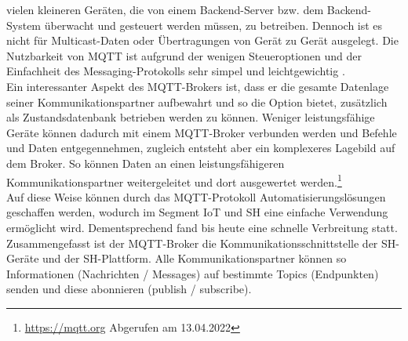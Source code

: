         vielen kleineren Geräten, die von einem Backend-Server bzw. dem Backend-System überwacht und gesteuert werden müssen, zu 
        betreiben. Dennoch ist es nicht für Multicast-Daten oder Übertragungen von Gerät zu Gerät ausgelegt. Die Nutzbarkeit 
        von \acs{MQTT} ist aufgrund der wenigen Steueroptionen und der Einfachheit des Messaging-Protokolls sehr simpel und 
        leichtgewichtig \cite{Naik2017}. 
        \\
        \linebreak
        Ein interessanter Aspekt des \acs{MQTT}-Brokers ist, dass er die gesamte Datenlage seiner Kommunikationspartner aufbewahrt und 
        so die Option bietet, zusätzlich als Zustandsdatenbank betrieben werden zu können. Weniger leistungsfähige Geräte können dadurch  
        mit einem \acs{MQTT}-Broker verbunden werden und Befehle und Daten entgegennehmen, zugleich entsteht aber ein 
        komplexeres Lagebild auf dem Broker. So können Daten an einen leistungsfähigeren Kommunikationspartner 
        weitergeleitet und dort ausgewertet werden.\footnote{\url{https://mqtt.org} Abgerufen am 13.04.2022}
        \\
        Auf diese Weise können durch das \acl{MQTT}-Protokoll Automatisierungslösungen geschaffen werden, wodurch im Segment 
        \acs{IoT} und \acl{SH} eine einfache Verwendung ermöglicht wird. Dementsprechend fand bis heute eine 
        schnelle Verbreitung statt. 
        \\
        \linebreak
        Zusammengefasst ist der \acs{MQTT}-Broker die Kommunikationsschnittstelle der \acl{SH}-Geräte und der \acl{SH}-Plattform. 
        Alle Kommunikationspartner können so Informationen (Nachrichten / Messages) auf bestimmte Topics (Endpunkten) senden und 
        diese abonnieren (publish / subscribe). 

